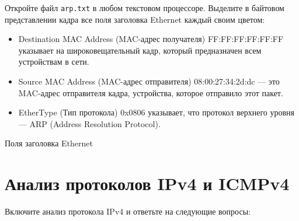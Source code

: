 Откройте файл \texttt{arp.txt} в любом текстовом процессоре.
Выделите в байтовом представлении кадра все поля заголовка
Ethernet каждый своим цветом:

\begin{itemize}
	\item Destination MAC Address (MAC-адрес получателя)
		FF:FF:FF:FF:FF:FF указывает на широковещательный кадр,
		который предназначен всем устройствам в сети.
	\item Source MAC Address (MAC-адрес отправителя)
		08:00:27:34:2d:dc --- это MAC-адрес отправителя кадра,
		устройства, которое отправило этот пакет.
	\item EtherType (Тип протокола)
		0x0806 указывает, что протокол верхнего уровня --- ARP
		(Address Resolution Protocol).
\end{itemize}

\begin{image}
	\caption{Поля заголовка Ethernet}
	\label{fig:wrsh:arp:txt}
\end{image}

\section{Анализ протоколов IPv4 и ICMPv4}

Включите анализ протокола IPv4 
и ответьте на следующие вопросы:

